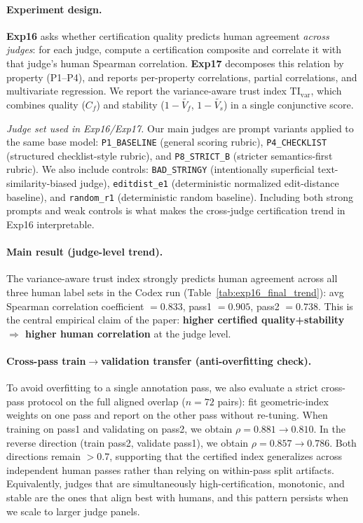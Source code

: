 \documentclass[numbers]{article}
\begin{document}
\paragraph{Experiment design.}
\textbf{Exp16} asks whether certification quality predicts human agreement \emph{across judges}: for each judge, compute a certification composite and correlate it with that judge's human Spearman correlation.
\textbf{Exp17} decomposes this relation by property (P1--P4), and reports per-property correlations, partial correlations, and multivariate regression.
We report the variance-aware trust index \(\mathrm{TI}_{\mathrm{var}}\), which combines
quality (\(C_f\)) and stability (\(1-\widetilde{V_f}\), \(1-\widetilde{V_s}\)) in a single conjunctive score.

\noindent\textit{Judge set used in Exp16/Exp17.}
Our main judges are prompt variants applied to the same base model:
\texttt{P1\_BASELINE} (general scoring rubric),
\texttt{P4\_CHECKLIST} (structured checklist-style rubric),
and \texttt{P8\_STRICT\_B} (stricter semantics-first rubric).
We also include controls:
\texttt{BAD\_STRINGY} (intentionally superficial text-similarity-biased judge),
\texttt{editdist\_e1} (deterministic normalized edit-distance baseline),
and \texttt{random\_r1} (deterministic random baseline).
Including both strong prompts and weak controls is what makes the cross-judge certification trend in Exp16 interpretable.

\paragraph{Main result (judge-level trend).}
The variance-aware trust index strongly predicts human agreement across all three human label sets in the Codex run (Table~\ref{tab:exp16_final_trend}):
avg Spearman correlation coefficient \(=0.833\), pass1 \(=0.905\), pass2 \(=0.738\).
This is the central empirical claim of the paper: \textbf{higher certified quality+stability \(\Rightarrow\) higher human correlation} at the judge level.

\paragraph{Cross-pass train\(\rightarrow\)validation transfer (anti-overfitting check).}
To avoid overfitting to a single annotation pass, we also evaluate a strict cross-pass protocol on the full aligned overlap (\(n=72\) pairs): fit geometric-index weights on one pass and report on the other pass without re-tuning.
When training on pass1 and validating on pass2, we obtain \(\rho=0.881\rightarrow0.810\).
In the reverse direction (train pass2, validate pass1), we obtain \(\rho=0.857\rightarrow0.786\).
Both directions remain \(>0.7\), supporting that the certified index generalizes across independent human passes rather than relying on within-pass split artifacts.
Equivalently, judges that are simultaneously high-certification, monotonic, and stable are the ones that align best with humans, and this pattern persists when we scale to larger judge panels.
\end{document}
